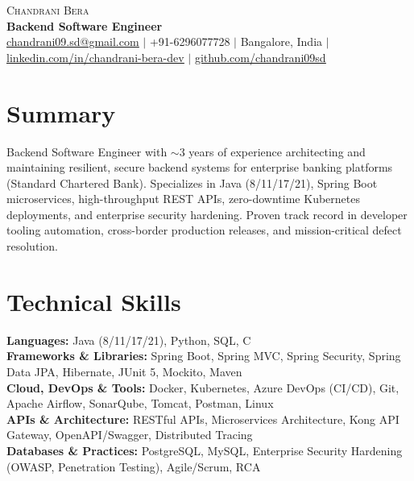 \documentclass[letterpaper,10pt]{article}
\begin{document}
\begin{center}
    {\Huge \scshape Chandrani Bera} \\ \vspace{2pt}
    \textbf{\large Backend Software Engineer} \\ \vspace{3pt}
    \small 
    \href{mailto:chandrani09.sd@gmail.com}{\underline{chandrani09.sd@gmail.com}} $|$ 
    +91-6296077728 $|$ 
    Bangalore, India $|$ 
    \href{https://www.linkedin.com/in/chandrani-bera-dev/}{\underline{linkedin.com/in/chandrani-bera-dev}} $|$ 
    \href{https://github.com/chandrani09sd}{\underline{github.com/chandrani09sd}}
\end{center}
\vspace{-10pt}

\section{Summary}
\small{Backend Software Engineer with $\sim$3 years of experience architecting and maintaining resilient, secure backend systems for enterprise banking platforms (Standard Chartered Bank). Specializes in Java (8/11/17/21), Spring Boot microservices, high-throughput REST APIs, zero-downtime Kubernetes deployments, and enterprise security hardening. Proven track record in developer tooling automation, cross-border production releases, and mission-critical defect resolution.}
\vspace{-3pt}

\section{Technical Skills}
 \begin{itemize}[leftmargin=0.0in, label={}]
    \small{\item{
     \textbf{Languages:}{ Java (8/11/17/21), Python, SQL, C} \\
     \textbf{Frameworks \& Libraries:}{ Spring Boot, Spring MVC, Spring Security, Spring Data JPA, Hibernate, JUnit 5, Mockito, Maven} \\
     \textbf{Cloud, DevOps \& Tools:}{ Docker, Kubernetes, Azure DevOps (CI/CD), Git, Apache Airflow, SonarQube, Tomcat, Postman, Linux} \\
     \textbf{APIs \& Architecture:}{ RESTful APIs, Microservices Architecture, Kong API Gateway, OpenAPI/Swagger, Distributed Tracing} \\
     \textbf{Databases \& Practices:}{ PostgreSQL, MySQL, Enterprise Security Hardening (OWASP, Penetration Testing), Agile/Scrum, RCA}
    }}
 \end{itemize}
\vspace{-10pt}
\end{document}
